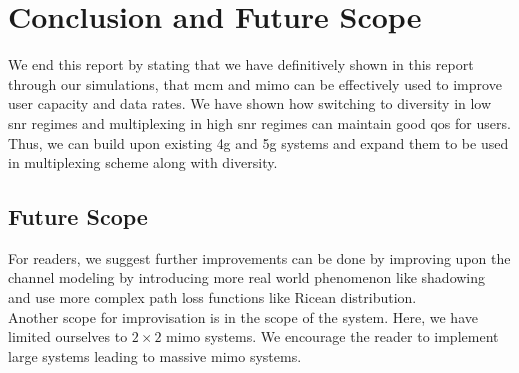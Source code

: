 \chapter{Conclusion and Future Scope}
We end this report by stating that we have definitively shown in this report through our simulations, that \acrshort{mcm} and \acrshort{mimo} can be effectively used to improve user capacity and data rates. We have shown how switching to diversity in low \acrshort{snr} regimes and multiplexing in high \acrshort{snr} regimes can maintain good \acrlong{qos} for users. Thus, we can build upon existing \acrshort{4g} and \acrshort{5g} systems and expand them to be used in multiplexing scheme along with diversity.

\section{Future Scope}
For readers, we suggest further improvements can be done by improving upon the channel modeling by introducing more real world phenomenon like shadowing and use more complex path loss functions like Ricean distribution.\\
Another scope for improvisation is in the scope of the system. Here, we have limited ourselves to $2 \times 2$ \acrshort{mimo} systems. We encourage the reader to implement large systems leading to massive \acrshort{mimo} systems.\\


